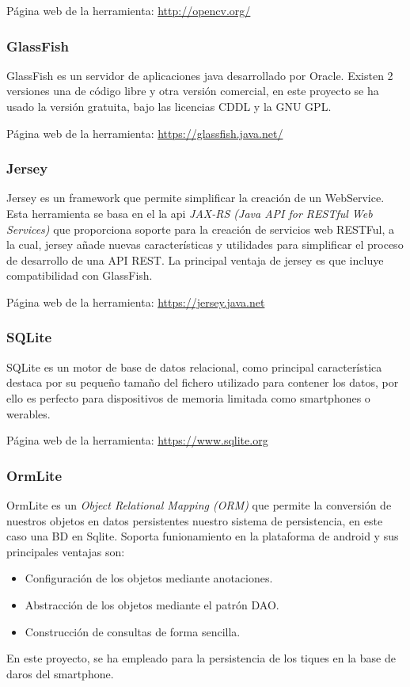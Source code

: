 Página web de la herramienta: \url{http://opencv.org/}

\subsubsection{GlassFish}
GlassFish es un servidor de aplicaciones java desarrollado por Oracle.
Existen 2 versiones una de código libre y otra versión comercial, en este proyecto se ha usado la versión gratuita, bajo las licencias CDDL y la GNU GPL.

Página web de la herramienta: \url{https://glassfish.java.net/}

\subsubsection{Jersey}
Jersey es un framework que permite simplificar la creación de un WebService.
Esta herramienta se basa en el la api \textit{JAX-RS (Java API for RESTful Web Services)} \cite{wiki:JAX-RS} que proporciona soporte para la creación de servicios web RESTFul, a la cual, jersey añade nuevas características y utilidades para simplificar el proceso de desarrollo de una API REST.
La principal ventaja de jersey es que incluye compatibilidad con GlassFish.

Página web de la herramienta: \url{https://jersey.java.net}

\subsubsection{SQLite}
SQLite es un motor de base de datos relacional, como principal característica destaca por su pequeño tamaño del fichero utilizado para contener los datos, por ello es perfecto para dispositivos de memoria limitada como smartphones o werables.

Página web de la herramienta: \url{https://www.sqlite.org}

 
 \subsubsection{OrmLite}
 OrmLite es un \textit{Object Relational Mapping (ORM)} que permite la conversión de nuestros objetos en datos persistentes nuestro sistema de persistencia, en este caso una BD en Sqlite. Soporta funionamiento en la plataforma de android y sus principales ventajas son:
 	\begin{itemize}
 		\item Configuración de los objetos  mediante anotaciones.
 		\item Abstracción de los objetos mediante el patrón DAO.
 		\item Construcción de consultas de forma sencilla.
 	\end{itemize}
En este proyecto, se ha empleado para la persistencia de los tiques en la base de daros del smartphone.


